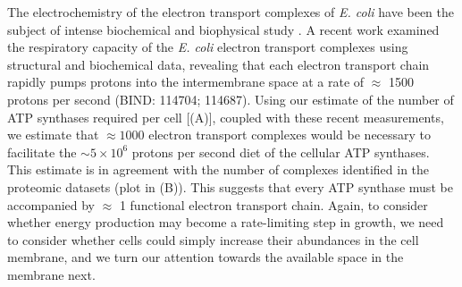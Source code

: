 
The electrochemistry of the electron transport complexes of \textit{E. coli}
have been the subject of intense biochemical and biophysical study
\citep{ingledew1984, khademian2017,cox1970,henkel2014}. A recent work
\citep{szenk2017} examined the respiratory capacity of the \textit{E. coli}
electron transport complexes using structural and biochemical data, revealing
that each electron transport chain rapidly pumps protons into the
intermembrane space at a rate of $\approx$ 1500 protons per second (BIND:
114704; 114687). Using our estimate of the number of ATP synthases required
per cell [(A)], coupled with these recent
measurements, we estimate that $\approx 1000$ electron transport complexes
would be necessary to facilitate the $\sim 5 \times 10^6$ protons per second
diet of the cellular ATP synthases. This estimate is in agreement with the
number of complexes identified in the proteomic datasets (plot in
(B)). This suggests that every ATP synthase must be
accompanied by $\approx$ 1 functional electron transport chain. Again, to
consider whether energy production may become a rate-limiting step in growth,
we need to consider whether cells could simply increase their abundances in
the cell membrane, and we turn our attention towards the available space in
the membrane next.



